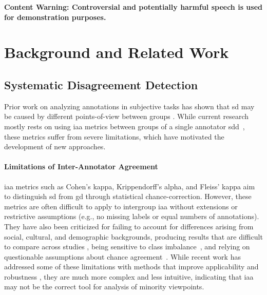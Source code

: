\documentclass[manuscript,screen,review,anonymous]{acmart}
\theoremstyle{acmplain}
\theoremstyle{researchquestionstyle}
\newcommand{\warning}[1]{\textcolor{ACMRed}{\textbf{#1}}}
\begin{document}
\begin{center}
	\noindent\warning{Content Warning: Controversial and potentially harmful speech is used for demonstration purposes.}
\end{center}


\section{Background and Related Work}
\label{sec:related}

\subsection{Systematic Disagreement Detection}
Prior work on analyzing annotations in subjective tasks has shown that \ac{sd} may be caused by different points-of-view between groups \citep{davani-etal-2022-dealing, uma2021, goyal2022your}. While current research mostly rests on using \ac{iaa} metrics between groups of a single annotator \ac{sdd}~\citep{davani-etal-2022-dealing, leonardelli-etal-2023-semeval, uma_2022_scaling, ivey-etal-2025-nutmeg, petra_2022_handling, van_der_Velden}, these metrics suffer from severe limitations, which have motivated the development of new approaches.

\paragraph{Limitations of Inter-Annotator Agreement} \ac{iaa} metrics such as Cohen's kappa, Krippendorff's alpha, and Fleiss' kappa aim to distinguish \ac{sd} from \ac{gd} through statistical chance-correction. However, these metrics are often difficult to apply to intergroup \ac{iaa} without extensions or restrictive assumptions (e.g., no missing labels or equal numbers of annotations). They have also been criticized for failing to account for differences arising from social, cultural, and demographic backgrounds, producing results that are difficult to compare across studies \citep{Feinstein1990, Byrt1993, van_der_Velden, checco_2017}, being sensitive to class imbalance~\citep{Feinstein1990}, and relying on questionable assumptions about chance agreement~\citep{checco_2017}. While recent work has addressed some of these limitations with methods that improve applicability and robustness \citep{van_der_Velden, wong-etal-2021-cross, ivey-etal-2025-nutmeg}, they are much more complex and less intuitive, indicating that \ac{iaa} may not be the correct tool for analysis of minority viewpoints.
\end{document}
